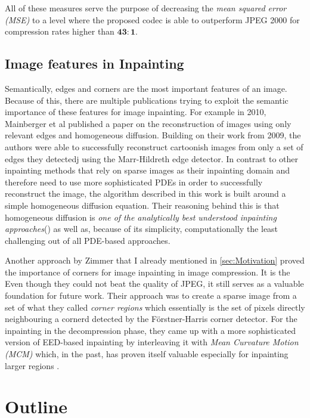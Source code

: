     All of these measures serve the purpose of decreasing the \textit{mean squared error (MSE)} to a
level where the proposed codec is able to outperform JPEG 2000 for compression rates higher than
$\mathbf{43:1}$.

\subsection{Image features in Inpainting}

Semantically, edges and corners are the most important features of an image. Because of this, there
are multiple publications trying to exploit the semantic importance of these features for image
inpainting. For example in 2010, Mainberger et al published a paper on the reconstruction of images
using only relevant edges and homogeneous diffusion. Building on their work from 2009, the authors
were able to successfully reconstruct cartoonish images from only a set of edges they detectedj
using the Marr-Hildreth edge detector\cite{hildreth85}.
In contrast to other inpainting methods that rely on sparse images as their inpainting domain 
and therefore need to use more sophisticated PDEs in order to successfully reconstruct the image, 
the algorithm described in this work is built around a simple homogeneous diffusion equation\cite{mainberger10}. 
Their reasoning behind this is that homogeneous diffusion is \textit{one of the analytically best 
understood inpainting approaches}(\cite{mainberger10}) as well as, because of its simplicity, 
computationally the least challenging out of all PDE-based approaches.

Another approach by Zimmer that I already mentioned in \ref{sec:Motivation} proved the importance of corners
for image inpainting in image compression\cite{zimmer07}. It is the Even though they could not beat the quality of JPEG, it
still serves as a valuable foundation for future work. Their approach was to create a sparse image
from a set of what they called \textit{corner regions} which essentially is the set of pixels
directly neighbouring a cornerd detected by the F\"orstner-Harris corner
detector\cite{harris88}. For the inpainting in the decompression phase, they came up with a more
sophisticated version of EED-based inpainting by interleaving it with \textit{Mean Curvature Motion
    (MCM)} which, in the past, has proven itself valuable especially for inpainting larger regions
\cite{bertalmio00}.

\section{Outline}

